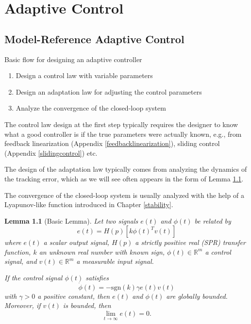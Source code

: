 \documentclass[
]{book}
\newtheorem{lemma}{Lemma}[chapter]
\theoremstyle{definition}
\theoremstyle{definition}
\theoremstyle{definition}
\theoremstyle{definition}
\theoremstyle{remark}
\begin{document}
\hypertarget{adaptivecontrol}{%
\chapter{Adaptive Control}\label{adaptivecontrol}}

\hypertarget{model-reference-adaptive-control}{%
\section{Model-Reference Adaptive Control}\label{model-reference-adaptive-control}}

Basic flow for designing an adaptive controller

\begin{enumerate}
\def\labelenumi{\arabic{enumi}.}
\item
  Design a control law with variable parameters
\item
  Design an adaptation law for adjusting the control parameters
\item
  Analyze the convergence of the closed-loop system
\end{enumerate}

The control law design at the first step typically requires the designer to know what a good controller is if the true parameters were actually known, e.g., from feedback linearization (Appendix \ref{feedbacklinearization}), sliding control (Appendix \ref{slidingcontrol}) etc.

The design of the adaptation law typically comes from analyzing the dynamics of the tracking error, which as we will see often appears in the form of Lemma \ref{lem:adaptivecontrolbasic}.

The convergence of the closed-loop system is usually analyzed with the help of a Lyapunov-like function introduced in Chapter \ref{stability}.

\begin{lemma}[Basic Lemma]
\protect\hypertarget{lem:adaptivecontrolbasic}{}\label{lem:adaptivecontrolbasic}Let two signals \(e(t)\) and \(\phi(t)\) be related by
\begin{equation}
e(t) = H(p)[k \phi(t)^T v(t)]
\label{eq:acbasiclemmaephi}
\end{equation}
where \(e(t)\) a scalar output signal, \(H(p)\) a strictly positive real (SPR) transfer function, \(k\) an unknown real number with known sign, \(\phi(t) \in \mathbb{R}^m\) a control signal, and \(v(t) \in \mathbb{R}^m\) a measurable input signal.

If the control signal \(\phi(t)\) satisfies
\begin{equation}
\dot{\phi}(t) = - \mathrm{sgn}(k) \gamma e(t) v(t)
\label{eq:acbasiclemmaphilaw}
\end{equation}
with \(\gamma > 0\) a positive constant, then \(e(t)\) and \(\phi(t)\) are globally bounded. Moreover, if \(v(t)\) is bounded, then
\[
\lim_{t \rightarrow \infty} e(t) = 0.
\]
\end{lemma}
\end{document}
